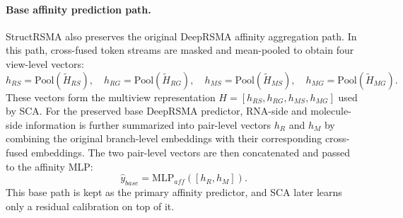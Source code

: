 ﻿\documentclass[journal=jcisd8,manuscript=article]{achemso}
\begin{document}
\paragraph{Base affinity prediction path.}
StructRSMA also preserves the original DeepRSMA affinity aggregation path. In this path, cross-fused token streams are masked and mean-pooled to obtain four view-level vectors:
\begin{equation}
h_{RS}=\mathrm{Pool}(\tilde{H}_{RS}),\quad
h_{RG}=\mathrm{Pool}(\tilde{H}_{RG}),\quad
h_{MS}=\mathrm{Pool}(\tilde{H}_{MS}),\quad
h_{MG}=\mathrm{Pool}(\tilde{H}_{MG}).
\end{equation}
These vectors form the multiview representation $H=[h_{RS},h_{RG},h_{MS},h_{MG}]$ used by SCA. For the preserved base DeepRSMA predictor, RNA-side and molecule-side information is further summarized into pair-level vectors $h_R$ and $h_M$ by combining the original branch-level embeddings with their corresponding cross-fused embeddings. The two pair-level vectors are then concatenated and passed to the affinity MLP:
\begin{equation}
\hat{y}_{base} = \mathrm{MLP}_{aff}([h_R,h_M]).
\end{equation}
This base path is kept as the primary affinity predictor, and SCA later learns only a residual calibration on top of it.
\end{document}
